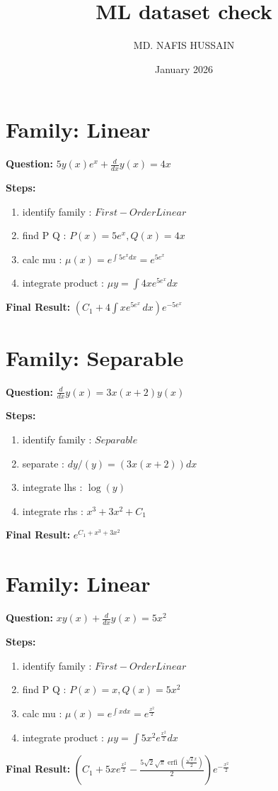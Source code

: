 \documentclass{article}
\title{ML dataset check}
\author{MD. NAFIS HUSSAIN}
\date{January 2026}
\begin{document}
\maketitle
\section*{Family: Linear}
\textbf{Question:} $5 y{\left(x \right)} e^{x} + \frac{d}{d x} y{\left(x \right)} = 4 x$

\textbf{Steps:}
\begin{enumerate}
\item identify family :  $First-Order Linear$
\item find P Q :  $P(x)=5 e^{x}, Q(x)=4 x$
\item calc mu :  $\mu(x) = e^{\int 5 e^{x} dx} = e^{5 e^{x}}$
\item integrate product :  $\mu y = \int 4 x e^{5 e^{x}} dx$
\end{enumerate}
\textbf{Final Result:} $\left(C_{1} + 4 \int x e^{5 e^{x}}\, dx\right) e^{- 5 e^{x}}$

\section*{Family: Separable}
\textbf{Question:} $\frac{d}{d x} y{\left(x \right)} = 3 x \left(x + 2\right) y{\left(x \right)}$

\textbf{Steps:}
\begin{enumerate}
\item identify family :  $Separable$
\item separate :  $dy / (y) = (3 x \left(x + 2\right)) dx$
\item integrate lhs :  $\log{\left(y \right)}$
\item integrate rhs :  $x^{3} + 3 x^{2} + C_1$
\end{enumerate}
\textbf{Final Result:} $e^{C_{1} + x^{3} + 3 x^{2}}$

\section*{Family: Linear}
\textbf{Question:} $x y{\left(x \right)} + \frac{d}{d x} y{\left(x \right)} = 5 x^{2}$

\textbf{Steps:}
\begin{enumerate}
\item identify family :  $First-Order Linear$
\item find P Q :  $P(x)=x, Q(x)=5 x^{2}$
\item calc mu :  $\mu(x) = e^{\int x dx} = e^{\frac{x^{2}}{2}}$
\item integrate product :  $\mu y = \int 5 x^{2} e^{\frac{x^{2}}{2}} dx$
\end{enumerate}
\textbf{Final Result:} $\left(C_{1} + 5 x e^{\frac{x^{2}}{2}} - \frac{5 \sqrt{2} \sqrt{\pi} \operatorname{erfi}{\left(\frac{\sqrt{2} x}{2} \right)}}{2}\right) e^{- \frac{x^{2}}{2}}$
\end{document}
